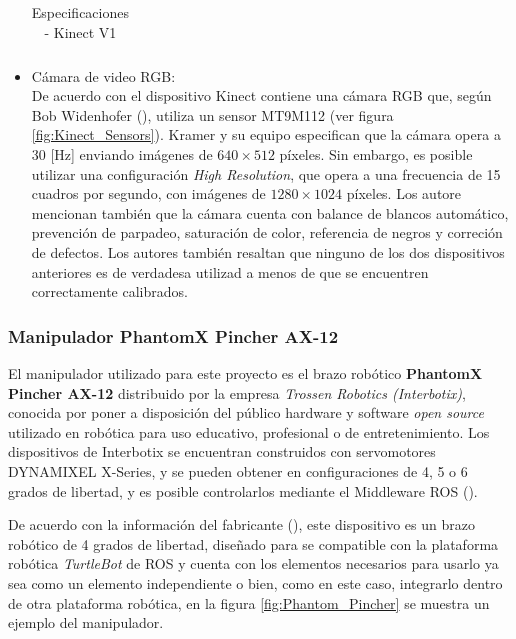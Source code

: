 \begin{itemize}
\begin{table}
\begin{tabular}{|c|c|}
                \hline
                \end{tabular}
                \caption{Especificaciones - Kinect V1}
                \label{tab:Kinect_especs}
            \end{table}

            \item Cámara de video RGB: \\
            De acuerdo con \cite{kramer_hacking_2012} el dispositivo Kinect contiene una cámara RGB que, según Bob Widenhofer (\cite*{eetimes_inside_2010}), utiliza un sensor MT9M112 (ver figura \ref{fig:Kinect_Sensors}). Kramer y su equipo especifican que la cámara opera a 30 [Hz] enviando imágenes de $640\times512$ píxeles. Sin embargo, es posible utilizar una configuración \textit{High Resolution}, que opera a una frecuencia de 15 cuadros por segundo, con imágenes de $1280\times1024$ píxeles. Los autore mencionan también que la cámara cuenta con balance de blancos automático, prevención de parpadeo, saturación de color, referencia de negros y correción de defectos. Los autores también resaltan que ninguno de los dos dispositivos anteriores es de verdadesa utilizad a menos de que se encuentren correctamente calibrados. 
            \end{itemize}
            
            \subsubsection{Manipulador PhantomX Pincher AX-12}
            El manipulador utilizado para este proyecto es el brazo robótico \textbf{PhantomX Pincher AX-12} distribuido por la empresa \textit{Trossen Robotics (Interbotix)}, conocida por poner a disposición del público hardware y software \textit{open source} utilizado en robótica para uso educativo, profesional o de entretenimiento. Los dispositivos de Interbotix se encuentran construidos con servomotores DYNAMIXEL X-Series, y se pueden obtener en configuraciones de 4, 5 o 6 grados de libertad, y es posible controlarlos mediante el Middleware ROS (\cite{Interbotix_interbotix}). 
            
            De acuerdo con la información del fabricante (\cite*{Interbotix_widowx_PincherArm}), este dispositivo es un brazo robótico de 4 grados de libertad, diseñado para se compatible con la plataforma robótica \textit{TurtleBot} de ROS y cuenta con los elementos necesarios para usarlo ya sea como un elemento independiente o bien, como en este caso, integrarlo dentro de otra plataforma robótica, en la figura \ref{fig:Phantom_Pincher} se muestra un ejemplo del manipulador.\newpage
            
